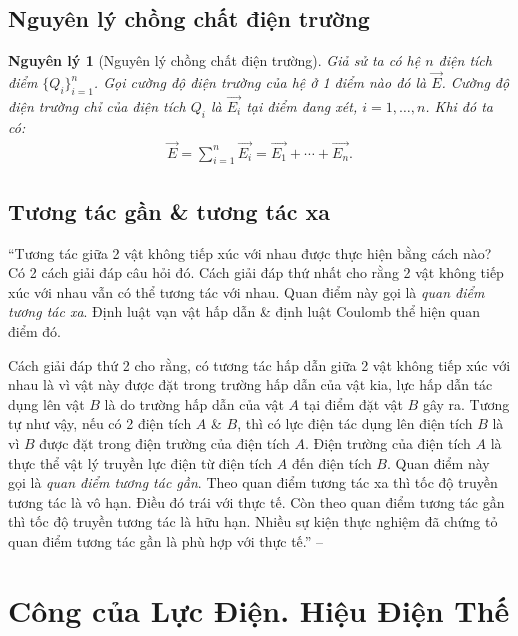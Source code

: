 \documentclass[oneside]{book}
\numberwithin{equation}{section}
\newtheorem{nguyenly}{Nguyên lý}[section]
\begin{document}
\subsection{Nguyên lý chồng chất điện trường}

\begin{nguyenly}[Nguyên lý chồng chất điện trường]
	Giả sử ta có hệ $n$ điện tích điểm $\{Q_i\}_{i=1}^n$. Gọi cường độ điện trường của hệ ở 1 điểm nào đó là $\overrightarrow{E}$. Cường độ điện trường chỉ của điện tích $Q_i$ là $\overrightarrow{E_i}$ tại điểm đang xét, $i = 1,\ldots, n$. Khi đó ta có:
	\begin{align}
		\label{nguyen ly chong chat dien truong}
		\overrightarrow{E} = \sum_{i=1}^n \overrightarrow{E_i} = \overrightarrow{E_1} + \cdots + \overrightarrow{E_n}.
	\end{align}
\end{nguyenly}

\subsection{Tương tác gần \& tương tác xa}
``Tương tác giữa 2 vật không tiếp xúc với nhau được thực hiện bằng cách nào? Có 2 cách giải  đáp câu hỏi đó. Cách giải đáp thứ nhất cho rằng 2 vật không tiếp xúc với nhau vẫn có thể tương tác với nhau. Quan điểm này gọi là \textit{quan điểm tương tác xa}. Định luật vạn vật hấp dẫn \& định luật Coulomb thể hiện quan điểm đó.

Cách giải đáp thứ 2 cho rằng, có tương tác hấp dẫn giữa 2 vật không tiếp xúc với nhau là vì vật này được đặt trong trường hấp dẫn của vật kia, lực hấp dẫn tác dụng lên vật $B$ là do trường hấp dẫn của vật $A$ tại điểm đặt vật $B$ gây ra. Tương tự như vậy, nếu có 2 điện tích $A$ \& $B$, thì có lực điện tác dụng lên điện tích $B$ là vì $B$ được đặt trong điện trường của điện tích $A$. Điện trường của điện tích $A$ là thực thể vật lý truyền lực điện từ điện tích $A$ đến điện tích $B$. Quan điểm này gọi là \textit{quan điểm tương tác gần}. Theo quan điểm tương tác xa thì tốc độ truyền tương tác là vô hạn. Điều đó trái với thực tế. Còn theo quan điểm tương tác gần thì tốc độ truyền tương tác là hữu hạn. Nhiều sự kiện thực nghiệm đã chứng tỏ quan điểm tương tác gần là phù hợp với thực tế.'' -- \cite[p. 18]{SGK_Vat_Ly_11_nang_cao}


\section{Công của Lực Điện. Hiệu Điện Thế}
\end{document}
